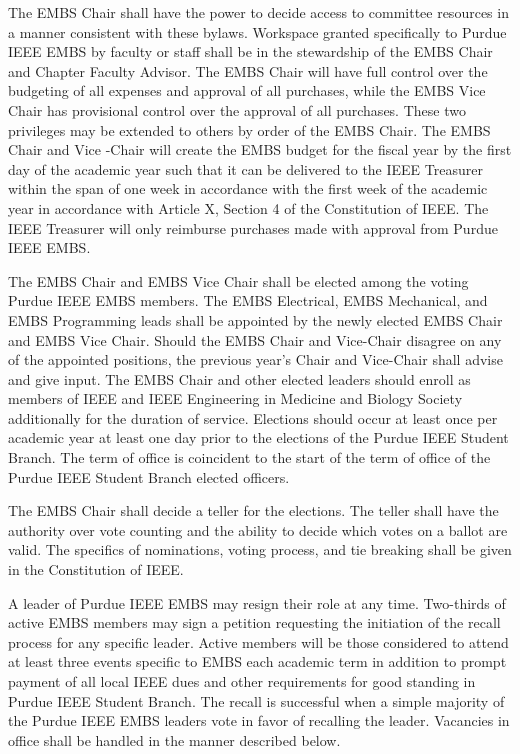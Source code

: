 \documentclass[12pt]{constitution}
\begin{document}
The EMBS Chair shall have the power to decide access to committee resources in a manner consistent with these bylaws. Workspace granted specifically to Purdue IEEE EMBS by faculty or staff shall be in the stewardship of the EMBS Chair and Chapter Faculty Advisor. The EMBS Chair will have full control over the budgeting of all expenses and approval of all purchases, while the EMBS Vice Chair has provisional control over the approval of all purchases. These two privileges may be extended to others by order of the EMBS Chair. The EMBS Chair and Vice -Chair will create the EMBS budget for the fiscal year by the first day of the academic year such that it can be delivered to the IEEE Treasurer within the span of one week in accordance with the first week of the academic year in accordance with Article X, Section 4 of the Constitution of IEEE. The IEEE Treasurer will only reimburse purchases made with approval from Purdue IEEE EMBS.

\label{art:electdepart}

The EMBS Chair and EMBS Vice Chair shall be elected among the voting Purdue IEEE EMBS members. The EMBS Electrical, EMBS Mechanical, and EMBS Programming leads shall be appointed by the newly elected EMBS Chair and EMBS Vice Chair. Should the EMBS Chair and Vice-Chair disagree on any of the appointed positions, the previous year’s Chair and Vice-Chair shall advise and give input. The EMBS Chair and other elected leaders should enroll as members of IEEE and IEEE Engineering in Medicine and Biology Society additionally for the duration of service. Elections should occur at least once per academic year at least one day prior to the elections of the Purdue IEEE Student Branch. The term of office is coincident to the start of the term of office of the Purdue IEEE Student Branch elected officers.

The EMBS Chair shall decide a teller for the elections. The teller shall have the authority over vote counting and the ability to decide which votes on a ballot are valid. The specifics of nominations, voting process, and tie breaking shall be given in the Constitution of IEEE.

A leader of Purdue IEEE EMBS may resign their role at any time. Two-thirds of active EMBS members may sign a petition requesting the initiation of the recall process for any specific leader. Active members will be those considered to attend at least three events specific to EMBS each academic term in addition to prompt payment of all local IEEE dues and other requirements for good standing in Purdue IEEE Student Branch. The recall is successful when a simple majority of the Purdue IEEE EMBS leaders vote in favor of recalling the leader. Vacancies in office shall be handled in the manner described below.
\end{document}
